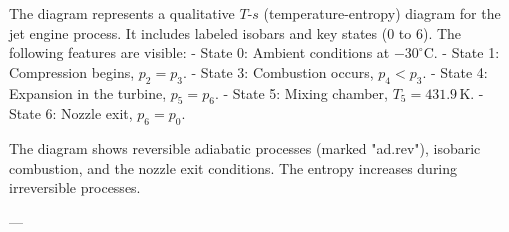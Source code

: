 The diagram represents a qualitative \( T \)-\( s \) (temperature-entropy) diagram for the jet engine process. It includes labeled isobars and key states (0 to 6). The following features are visible:  
- State 0: Ambient conditions at \( -30^\circ\text{C} \).  
- State 1: Compression begins, \( p_2 = p_3 \).  
- State 3: Combustion occurs, \( p_4 < p_3 \).  
- State 4: Expansion in the turbine, \( p_5 = p_6 \).  
- State 5: Mixing chamber, \( T_5 = 431.9 \, \text{K} \).  
- State 6: Nozzle exit, \( p_6 = p_0 \).  

The diagram shows reversible adiabatic processes (marked "ad.rev"), isobaric combustion, and the nozzle exit conditions. The entropy increases during irreversible processes.  

---